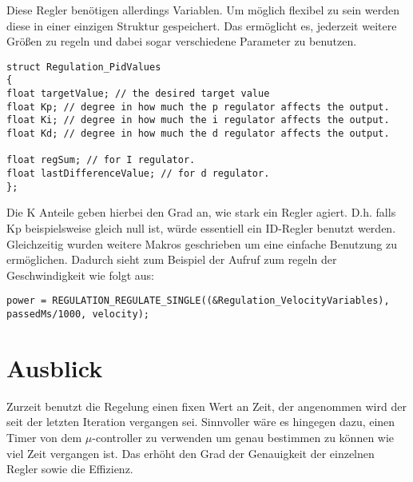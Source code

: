 Diese Regler benötigen allerdings Variablen. Um möglich flexibel zu sein werden diese in einer einzigen Struktur gespeichert. Das ermöglicht es, jederzeit weitere Größen zu regeln und dabei sogar verschiedene Parameter zu benutzen.

\begin{lstlisting}[frame=single, caption=Interne Abstrahierung des Sensorik Interface]
struct Regulation_PidValues
{
float targetValue; // the desired target value
float Kp; // degree in how much the p regulator affects the output.
float Ki; // degree in how much the i regulator affects the output.
float Kd; // degree in how much the d regulator affects the output.

float regSum; // for I regulator.
float lastDifferenceValue; // for d regulator.
};
\end{lstlisting}
Die K Anteile geben hierbei den Grad an, wie stark ein Regler agiert. D.h. falls Kp beispielsweise gleich null ist, würde essentiell ein ID-Regler benutzt werden.\\
Gleichzeitig wurden weitere Makros geschrieben um eine einfache Benutzung zu ermöglichen. Dadurch sieht zum Beispiel der Aufruf zum regeln der Geschwindigkeit wie folgt aus:\\
\begin{lstlisting}[frame=single, caption=Interne Abstrahierung des Sensorik Interface]
power = REGULATION_REGULATE_SINGLE((&Regulation_VelocityVariables), passedMs/1000, velocity);
\end{lstlisting}
\section{Ausblick}
Zurzeit benutzt die Regelung einen fixen Wert an Zeit, der angenommen wird der seit der letzten Iteration vergangen sei. Sinnvoller wäre es hingegen dazu, einen Timer von dem $\mu$-controller zu verwenden um genau bestimmen zu können wie viel Zeit vergangen ist. Das erhöht den Grad der Genauigkeit der einzelnen Regler sowie die Effizienz.
